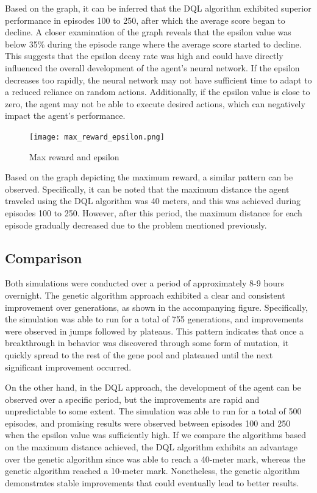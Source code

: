 \documentclass[letterpaper]{article} %
\begin{document}
\par Based on the graph, it can be inferred that the DQL algorithm exhibited superior performance in episodes 100 to 250, after which the average score began to decline. A closer examination of the graph reveals that the epsilon value was below 35\% during the episode range where the average score started to decline. This suggests that the epsilon decay rate was high and could have directly influenced the overall development of the agent's neural network. If the epsilon decreases too rapidly, the neural network may not have sufficient time to adapt to a reduced reliance on random actions. Additionally, if the epsilon value is close to zero, the agent may not be able to execute desired actions, which can negatively impact the agent's performance.

\begin{figure}[h]
\caption{Max reward and epsilon}
\centering
\texttt{[image: max\_reward\_epsilon.png]}
\end{figure}

\par Based on the graph depicting the maximum reward, a similar pattern can be observed. Specifically, it can be noted that the maximum distance the agent traveled using the DQL algorithm was 40 meters, and this was achieved during episodes 100 to 250. However, after this period, the maximum distance for each episode gradually decreased due to the problem mentioned previously.

\subsection{Comparison}
\par Both simulations were conducted over a period of approximately 8-9 hours overnight. The genetic algorithm approach exhibited a clear and consistent improvement over generations, as shown in the accompanying figure. Specifically, the simulation was able to run for a total of 755 generations, and improvements were observed in jumps followed by plateaus. This pattern indicates that once a breakthrough in behavior was discovered through some form of mutation, it quickly spread to the rest of the gene pool and plateaued until the next significant improvement occurred.

\par On the other hand, in the DQL approach, the development of the agent can be observed over a specific period, but the improvements are rapid and unpredictable to some extent. The simulation was able to run for a total of 500 episodes, and promising results were observed between episodes 100 and 250 when the epsilon value was sufficiently high. If we compare the algorithms based on the maximum distance achieved, the DQL algorithm exhibits an advantage over the genetic algorithm since was able to reach a 40-meter mark, whereas the genetic algorithm reached a 10-meter mark. Nonetheless, the genetic algorithm demonstrates stable improvements that could eventually lead to better results.
\end{document}
